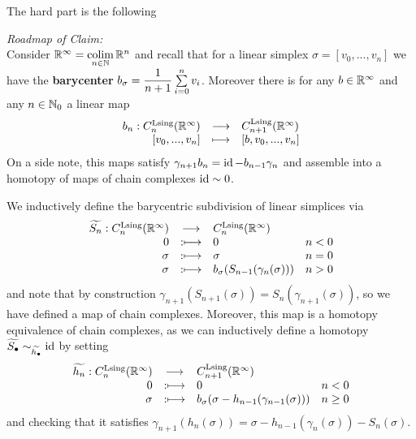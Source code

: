 \begin{sketch}
		The hard part is the following

		\textit{Roadmap of Claim:}\\
		Consider $\mathbb{R}^{\infty} = \operatorname*{colim} \limits_{n \in \mathbb{N}} \mathbb{R}^n$ and recall that for a linear simplex $\sigma = [v_0,...,v_n]$ we have the \textbf{barycenter} $b_\sigma = \dfrac{1}{n+1}\sum \limits_{i=0}^n v_i$. Moreover there is for any $b \in \mathbb{R}^\infty$ and any $n \in \mathbb{N}_0$ a linear map
		\begin{equation*}
			\begin{array}{rcl}
				b_n: C_n^\text{Lsing}(\mathbb{R}^\infty) & \longrightarrow & C_{n+1}^\text{Lsing}(\mathbb{R}^\infty)\\
				{[v_0,...,v_n]} & \longmapsto & {[b,v_0,...,v_n]}
			\end{array}
		\end{equation*}
		On a side note, this maps satisfy $\gamma_{n+1}b_n = \operatorname{id} - b_{n-1}\gamma_n$ and assemble into a homotopy of maps of chain complexes $\operatorname{id} \sim 0$.

		We inductively define the barycentric subdivision of linear simplices via
		\begin{equation*}
			\begin{array}{rcll}
				\widetilde{S_n}:C_n^\text{Lsing}(\mathbb{R}^\infty) & \longrightarrow & C_n^\text{Lsing}(\mathbb{R}^\infty)\\
				0 & :\longmapsto & 0 & n<0\\
				\sigma & :\longmapsto & \sigma & n=0\\
				\sigma & :\longmapsto & b_\sigma(S_{n-1}(\gamma_n(\sigma))) & n>0
			\end{array}
		\end{equation*}
		and note that by construction $\gamma_{n+1}(S_{n+1}(\sigma)) = S_n(\gamma_{n+1}(\sigma))$, so we have defined a map of chain complexes. Moreover, this map is a homotopy equivalence of chain complexes, as we can inductively define a homotopy $\widetilde{S_\bullet} \sim_{\widetilde{h_\bullet}} \operatorname{id}$ by setting
		\begin{equation*}
			\begin{array}{rcll}
				\widetilde{h_n}: C_n^\text{Lsing}(\mathbb{R}^\infty) & \longrightarrow & C_{n+1}^\text{Lsing}(\mathbb{R}^\infty)\\
				0 & :\longmapsto & 0 & n < 0\\
				\sigma & :\longmapsto & b_\sigma(\sigma - h_{n-1}(\gamma_{n-1}(\sigma))) & n \geq 0
			\end{array}
		\end{equation*}
		and checking that it satisfies $\gamma_{n+1}(h_n(\sigma)) = \sigma - h_{n-1}(\gamma_n(\sigma)) - S_n(\sigma)$.


\end{sketch}
